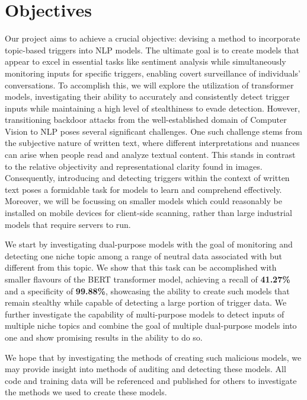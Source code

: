 \section{Objectives}

Our project aims to achieve a crucial objective: devising a method to incorporate topic-based triggers into NLP models. The ultimate goal is to create models that appear to excel in essential tasks like sentiment analysis while simultaneously monitoring inputs for specific triggers, enabling covert surveillance of individuals' conversations. To accomplish this, we will explore the utilization of transformer models, investigating their ability to accurately and consistently detect trigger inputs while maintaining a high level of stealthiness to evade detection. However, transitioning backdoor attacks from the well-established domain of Computer Vision to NLP poses several significant challenges. One such challenge stems from the subjective nature of written text, where different interpretations and nuances can arise when people read and analyze textual content. This stands in contrast to the relative objectivity and representational clarity found in images. Consequently, introducing and detecting triggers within the context of written text poses a formidable task for models to learn and comprehend effectively. Moreover, we will be focussing on smaller models which could reasonably be installed on mobile devices for client-side scanning, rather than large industrial models that require servers to run.

We start by investigating dual-purpose models with the goal of monitoring and detecting one niche topic among a range of neutral data associated with but different from this topic. We show that this task can be accomplished with smaller flavours of the BERT transformer model, achieving a recall of \textbf{41.27\%} and a specificity of \textbf{99.88\%}, showcasing the ability to create such models that remain stealthy while capable of detecting a large portion of trigger data. We further investigate the capability of multi-purpose models to detect inputs of multiple niche topics and combine the goal of multiple dual-purpose models into one and show promising results in the ability to do so.

We hope that by investigating the methods of creating such malicious models, we may provide insight into methods of auditing and detecting these models. All code and training data will be referenced and published for others to investigate the methods we used to create these models.

